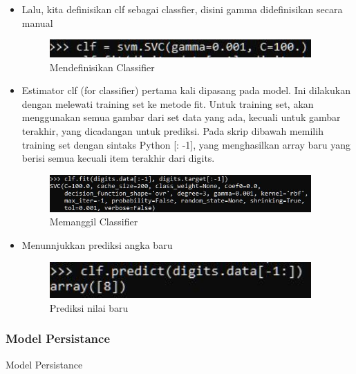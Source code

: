 \begin{itemize}
\item Lalu, kita definisikan clf sebagai classfier, disini gamma didefinisikan secara manual
\begin{figure}[H]
	\begin{center}
   	 \includegraphics[width=10cm]{figures/1174066/1/8.png}
   	 \caption{Mendefinisikan Classifier}	
	\end{center}
\end{figure}

\item Estimator clf (for classifier) pertama kali dipasang pada model. Ini dilakukan dengan melewati training set ke metode fit. Untuk training set, akan menggunakan semua gambar dari set data yang ada, kecuali untuk gambar terakhir, yang dicadangan untuk prediksi. Pada skrip dibawah memilih training set dengan sintaks Python [: -1], yang menghasilkan array baru yang berisi semua kecuali item terakhir dari digits.
\begin{figure}[H]
	\begin{center}
   	 \includegraphics[width=10cm]{figures/1174066/1/9.png}
   	 \caption{Memanggil Classifier}	
	\end{center}
\end{figure}

\item Menunnjukkan prediksi angka baru
\begin{figure}[H]
	\begin{center}
   	 \includegraphics[width=10cm]{figures/1174066/1/10.png}
   	 \caption{Prediksi nilai baru}	
	\end{center}
\end{figure}
\end{itemize}


\subsubsection{Model Persistance}
Model Persistance


